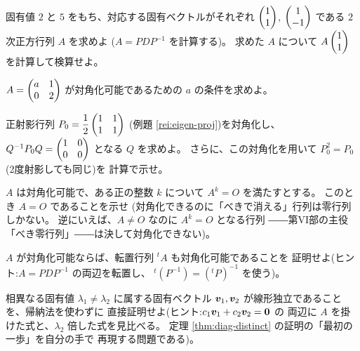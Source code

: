 \begin{mondai}[標準]\label{q:diag-ex7}
固有値 $2$ と $5$ をもち、対応する固有ベクトルがそれぞれ
$\begin{pmatrix}1 \\ 1\end{pmatrix}$, $\begin{pmatrix}1 \\ -1\end{pmatrix}$ である $2$ 次正方行列 $A$ を求めよ
($A = PDP^{-1}$ を計算する)。
求めた $A$ について $A\begin{pmatrix}1 \\ 1\end{pmatrix}$ を計算して検算せよ。
\end{mondai}

\begin{mondai}[標準]\label{q:diag-ex8}
$A = \begin{pmatrix}a & 1 \\ 0 & 2\end{pmatrix}$ が対角化可能であるための $a$ の条件を求めよ。
\end{mondai}

\begin{mondai}[発展]\label{q:diag-ex9}
正射影行列 $P_0 = \dfrac{1}{2}\begin{pmatrix}1 & 1 \\ 1 & 1\end{pmatrix}$
(例題 \ref{rei:eigen-proj})を対角化し、
$Q^{-1}P_0Q = \begin{pmatrix}1 & 0 \\ 0 & 0\end{pmatrix}$ となる $Q$ を求めよ。
さらに、この対角化を用いて $P_0^2 = P_0$(2度射影しても同じ)を
計算で示せ。
\end{mondai}

\begin{mondai}[発展]\label{q:diag-ex10}
$A$ は対角化可能で、ある正の整数 $k$ について $A^k = O$ を満たすとする。
このとき $A = O$ であることを示せ
(対角化できるのに「べきで消える」行列は零行列しかない。
逆にいえば、$A \neq O$ なのに $A^k = O$ となる行列
――第VI部の主役「べき零行列」――は決して対角化できない)。
\end{mondai}

\begin{mondai}[証明]\label{q:diag-ex11}
$A$ が対角化可能ならば、転置行列 ${}^t\!A$ も対角化可能であることを
証明せよ(ヒント:$A = PDP^{-1}$ の両辺を転置し、
${}^t(P^{-1}) = ({}^tP)^{-1}$ を使う)。
\end{mondai}

\begin{mondai}[証明]\label{q:diag-ex12}
相異なる固有値 $\lambda_1 \neq \lambda_2$ に属する固有ベクトル
$\bm{v}_1, \bm{v}_2$ が線形独立であることを、帰納法を使わずに
直接証明せよ(ヒント:$c_1\bm{v}_1 + c_2\bm{v}_2 = \bm{0}$ の
両辺に $A$ を掛けた式と、$\lambda_2$ 倍した式を見比べる。
定理 \ref{thm:diag-distinct} の証明の「最初の一歩」を自分の手で
再現する問題である)。
\end{mondai}

